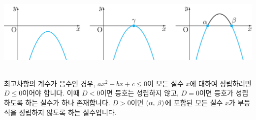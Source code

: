 \begin{center} \includegraphics[scale=\pgfkeysvalueof{picsize}]{DBs/pic/zery_31.pdf}\
	\end{center}최고차항의 계수가 음수인 경우, $ax^2 + bx + c \le 0$이 모든 실수 $x$에 대하여 성립하려면 $D \le 0$이어야 합니다. 이때 $D<0$이면 등호는 성립하지 않고, $D=0$이면 등호가 성립하도록 하는 실수가 하나 존재합니다. $D>0$이면 $\left(\alpha,\: \beta\right)$에 포함된 모든 실수 $x$가 부등식을 성립하지 않도록 하는 실수입니다.
